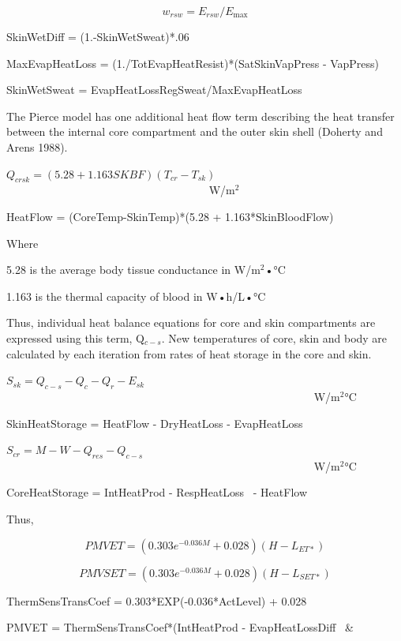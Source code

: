 \begin{equation}
{w_{rsw}} = {E_{rsw}}/{E_{\max }}
\end{equation}

SkinWetDiff = (1.-SkinWetSweat)*.06

MaxEvapHeatLoss = (1./TotEvapHeatResist)*(SatSkinVapPress - VapPress)

SkinWetSweat = EvapHeatLossRegSweat/MaxEvapHeatLoss

The Pierce model has one additional heat flow term describing the heat transfer between the internal core compartment and the outer skin shell (Doherty and Arens 1988).

\({Q_{crsk}} = (5.28 + 1.163SKBF)({T_{cr}} - {T_{sk}})\) ~~~~~~~~~~~~~~~~~~~~~~~~~~~~~~~~~~~~ W/m\(^{2}\)

HeatFlow = (CoreTemp-SkinTemp)*(5.28 + 1.163*SkinBloodFlow)

Where

5.28 is the average body tissue conductance in W/m\(^{2}\)•°C

1.163 is the thermal capacity of blood in W•h/L•°C

Thus, individual heat balance equations for core and skin compartments are expressed using this term, Q\(_{c-s}\). New temperatures of core, skin and body are calculated by each iteration from rates of heat storage in the core and skin.

\({S_{sk}} = {Q_{c - s}} - {Q_c} - {Q_r} - {E_{sk}}\) ~~~~~~~~~~~~~~~~~~~~~~~~~~~~~~~~~~~~~~~~~~~~~~~~~~~~~~~ W/m\(^{2}\)°C

SkinHeatStorage = HeatFlow - DryHeatLoss - EvapHeatLoss

\({S_{cr}} = M - W - {Q_{res}} - {Q_{c - s}}\) ~~~~~~~~~~~~~~~~~~~~~~~~~~~~~~~~~~~~~~~~~~~~~~~~~~~~~~~ W/m\(^{2}\)°C

CoreHeatStorage = IntHeatProd - RespHeatLoss~ - HeatFlow

Thus,

\begin{equation}
PMVET = (0.303{e^{ - 0.036M}} + 0.028)(H - {L_{ET*}})
\end{equation}

\begin{equation}
PMVSET = (0.303{e^{ - 0.036M}} + 0.028)(H - {L_{SET*}})
\end{equation}

ThermSensTransCoef = 0.303*EXP(-0.036*ActLevel) + 0.028

PMVET = ThermSensTransCoef*(IntHeatProd - EvapHeatLossDiff~ \&

